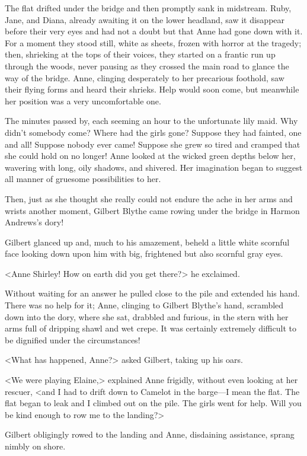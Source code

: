 The flat drifted under the bridge and then promptly sank in midstream. Ruby, Jane, and Diana, already awaiting it on the lower headland, saw it disappear before their very eyes and had not a doubt but that Anne had gone down with it. For a moment they stood still, white as sheets, frozen with horror at the tragedy; then, shrieking at the tops of their voices, they started on a frantic run up through the woods, never pausing as they crossed the main road to glance the way of the bridge. Anne, clinging desperately to her precarious foothold, saw their flying forms and heard their shrieks. Help would soon come, but meanwhile her position was a very uncomfortable one.

The minutes passed by, each seeming an hour to the unfortunate lily maid. Why didn't somebody come? Where had the girls gone? Suppose they had fainted, one and all! Suppose nobody ever came! Suppose she grew so tired and cramped that she could hold on no longer! Anne looked at the wicked green depths below her, wavering with long, oily shadows, and shivered. Her imagination began to suggest all manner of gruesome possibilities to her.

Then, just as she thought she really could not endure the ache in her arms and wrists another moment, Gilbert Blythe came rowing under the bridge in Harmon Andrews's dory!

Gilbert glanced up and, much to his amazement, beheld a little white scornful face looking down upon him with big, frightened but also scornful gray eyes.

<Anne Shirley! How on earth did you get there?> he exclaimed.

Without waiting for an answer he pulled close to the pile and extended his hand. There was no help for it; Anne, clinging to Gilbert Blythe's hand, scrambled down into the dory, where she sat, drabbled and furious, in the stern with her arms full of dripping shawl and wet crepe. It was certainly extremely difficult to be dignified under the circumstances!

<What has happened, Anne?> asked Gilbert, taking up his oars.

<We were playing Elaine,> explained Anne frigidly, without even looking at her rescuer, <and I had to drift down to Camelot in the barge—I mean the flat. The flat began to leak and I climbed out on the pile. The girls went for help. Will you be kind enough to row me to the landing?>

Gilbert obligingly rowed to the landing and Anne, disdaining assistance, sprang nimbly on shore.

